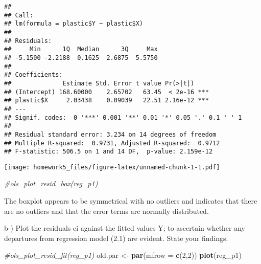 \documentclass[
]{article}
\newenvironment{Shaded}{\begin{snugshade}}{\end{snugshade}}
\newcommand{\CommentTok}[1]{\textcolor[rgb]{0.56,0.35,0.01}{\textit{#1}}}
\newcommand{\DataTypeTok}[1]{\textcolor[rgb]{0.13,0.29,0.53}{#1}}
\newcommand{\DecValTok}[1]{\textcolor[rgb]{0.00,0.00,0.81}{#1}}
\newcommand{\FloatTok}[1]{\textcolor[rgb]{0.00,0.00,0.81}{#1}}
\newcommand{\KeywordTok}[1]{\textcolor[rgb]{0.13,0.29,0.53}{\textbf{#1}}}
\newcommand{\NormalTok}[1]{#1}
\newcommand{\OperatorTok}[1]{\textcolor[rgb]{0.81,0.36,0.00}{\textbf{#1}}}
\newcommand{\OtherTok}[1]{\textcolor[rgb]{0.56,0.35,0.01}{#1}}
\newcommand{\StringTok}[1]{\textcolor[rgb]{0.31,0.60,0.02}{#1}}
\begin{document}
\begin{verbatim}
## 
## Call:
## lm(formula = plastic$Y ~ plastic$X)
## 
## Residuals:
##     Min      1Q  Median      3Q     Max 
## -5.1500 -2.2188  0.1625  2.6875  5.5750 
## 
## Coefficients:
##              Estimate Std. Error t value Pr(>|t|)    
## (Intercept) 168.60000    2.65702   63.45  < 2e-16 ***
## plastic$X     2.03438    0.09039   22.51 2.16e-12 ***
## ---
## Signif. codes:  0 '***' 0.001 '**' 0.01 '*' 0.05 '.' 0.1 ' ' 1
## 
## Residual standard error: 3.234 on 14 degrees of freedom
## Multiple R-squared:  0.9731, Adjusted R-squared:  0.9712 
## F-statistic: 506.5 on 1 and 14 DF,  p-value: 2.159e-12
\end{verbatim}

\begin{Shaded}
\end{Shaded}

\texttt{[image: homework5\_files/figure-latex/unnamed-chunk-1-1.pdf]}

\begin{Shaded}
\begin{Highlighting}[]
\CommentTok{#ols_plot_resid_box(reg_p1)}
\end{Highlighting}
\end{Shaded}

The boxplot appears to be symmetrical with no outliers and indicates
that there are no outliers and that the error terms are normally
distributed.

b-) Plot the residuals ei against the fitted values Y; to ascertain
whether any departures from regression model (2.1) are evident. State
your findings.

\begin{Shaded}
\begin{Highlighting}[]
\CommentTok{#ols_plot_resid_fit(reg_p1)}
\NormalTok{old.par <-}\StringTok{ }\KeywordTok{par}\NormalTok{(}\DataTypeTok{mfrow =} \KeywordTok{c}\NormalTok{(}\DecValTok{2}\NormalTok{,}\DecValTok{2}\NormalTok{))}
\KeywordTok{plot}\NormalTok{(reg_p1)}
\end{Highlighting}
\end{Shaded}
\end{document}
